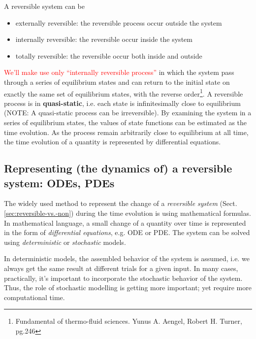 A reversible system can be
\begin{itemize}
\item externally reversible: the reversible process occur outside the
  system
\item internally reversible: the reversible occur inside the system
\item totally reversible: the reversible occur both inside and outside
\end{itemize}
\textcolor{red}{We'll make use only ``internally reversible process''}
in which the system pass through a series of equilibrium states and
can return to the initial state on exactly the same set of equilibrium
states, with the reverse
order\footnote{Fundamental of thermo-fluid sciences. Yunus A. Aengel,
  Robert H. Turner, pg.246}. A reversible process is in {\bf quasi-static}, i.e.
  each state is infinitesimally close to equilibrium (NOTE: A quasi-static process
  can be irreversible). By examining the system in a series of equilibrium
  states, the values of state functions can be estimated as the time evolution.
  As the process remain arbitrarily close to equilibrium at all time, the time
  evolution of a quantity is represented by differential equations.



\subsection{Representing (the dynamics of) a reversible system: ODEs, PDEs}
\label{sec:repr-dynam-syst}

The widely used method to represent the change of a {\it reversible system}
(Sect.\ref{sec:reversible-vs.-non}) during the time evolution is using
mathematical formulas. In mathematical language, a small change of a quantity
over time is represented in the form of {\it differential equations}, e.g. ODE
or PDE. The system can be solved using {\it deterministic} or {\it stochastic}
models.

In deterministic models, the assembled behavior of the system is assumed, i.e.
we always get the same result at different trials for a given input. In many
cases, practically, it's important to incorporate the stochastic behavior of the
system. Thus, the role of stochastic modelling is getting more important; yet
require more computational time.


